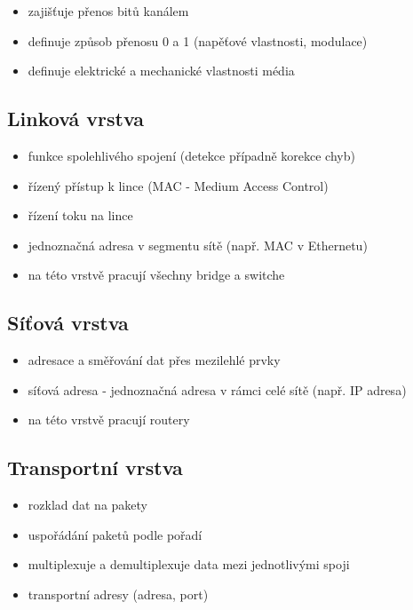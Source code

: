 \documentclass{szzclass}
\providecommand{\tightlist}{%
  \setlength{\itemsep}{0pt}\setlength{\parskip}{0pt}}
\begin{document}
\begin{itemize}
\tightlist
\item
  zajišťuje přenos bitů kanálem
\item
  definuje způsob přenosu 0 a 1 (napěťové vlastnosti, modulace)
\item
  definuje elektrické a mechanické vlastnosti média
\end{itemize}

\hypertarget{linkovuxe1-vrstva}{%
\subsection{Linková vrstva}\label{linkovuxe1-vrstva}}

\begin{itemize}
\tightlist
\item
  funkce spolehlivého spojení (detekce případně korekce chyb)
\item
  řízený přístup k lince (MAC - Medium Access Control)
\item
  řízení toku na lince
\item
  jednoznačná adresa v segmentu sítě (např. MAC v Ethernetu)
\item
  na této vrstvě pracují všechny bridge a switche
\end{itemize}

\hypertarget{suxedux165ovuxe1-vrstva}{%
\subsection{Síťová vrstva}\label{suxedux165ovuxe1-vrstva}}

\begin{itemize}
\tightlist
\item
  adresace a směřování dat přes mezilehlé prvky
\item
  síťová adresa - jednoznačná adresa v rámci celé sítě (např. IP adresa)
\item
  na této vrstvě pracují routery
\end{itemize}

\hypertarget{transportnuxed-vrstva}{%
\subsection{Transportní vrstva}\label{transportnuxed-vrstva}}

\begin{itemize}
\tightlist
\item
  rozklad dat na pakety
\item
  uspořádání paketů podle pořadí
\item
  multiplexuje a demultiplexuje data mezi jednotlivými spoji
\item
  transportní adresy (adresa, port)
\end{itemize}
\end{document}

